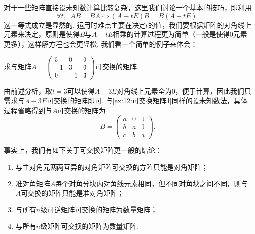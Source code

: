 对于一些矩阵直接设未知数计算比较复杂，这里我们讨论一个基本的技巧，即利用
\[\forall t,\enspace AB=BA \iff (A-tE)B=B(A-tE).\]
这一等式成立是显然的. 运用时难点主要在决定$t$的值，我们要根据矩阵的对角线上元素来决定，原则是使得$B$与$A-tE$相乘的计算过程更为简单（一般是使得0元素更多），这样解方程也会更轻松. 我们看一个简单的例子来体会：
\begin{example}
    求与矩阵$A=\begin{pmatrix}
            3  & 0  & 0 \\
            -1 & 3  & 0 \\
            0  & -1 & 3
        \end{pmatrix}$可交换的矩阵.
\end{example}

\begin{solution}
    由前述分析，取$t=3$可以使得$A-3E$对角线上元素全为0，便于计算，因此我们只需求与$A-3E$可交换的矩阵即可. 与\autoref{ex:12:可交换矩阵1}同样的设未知数法，具体过程省略得到与$A$可交换的矩阵为
    \[B=\begin{pmatrix}
        a & 0 & 0 \\
        b & a & 0 \\
        c & b & a
    \end{pmatrix}.\]
\end{solution}

事实上，我们有如下关于可交换矩阵更一般的结论：
\begin{theorem}
    \begin{enumerate}
        \item 与主对角元两两互异的对角矩阵可交换的方阵只能是对角矩阵；

        \item 准对角矩阵$A$每个对角分块内对角线元素相同，但不同对角块之间不同，则与$A$可交换的矩阵只能是准对角矩阵；

        \item 与所有$n$级可逆矩阵可交换的矩阵为数量矩阵；

        \item 与所有$n$级矩阵可交换的矩阵为数量矩阵.
    \end{enumerate}
\end{theorem}

